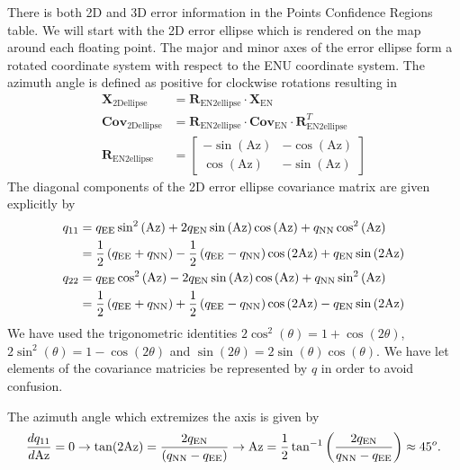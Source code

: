 There is both 2D and 3D error information in the Points Confidence Regions table.  We will start with the 2D error ellipse which is rendered on the map around each floating point.  The major and minor axes of the error ellipse form a rotated coordinate system with respect to the ENU coordinate system. The azimuth angle is defined as positive for clockwise rotations resulting in
\begin{equation}
\begin{split}
\mathbf{X}_{\text{2Dellipse}}&=\mathbf{R}_{\text{EN2ellipse}}\cdot\mathbf{X}_{\text{EN}} \\
\mathbf{Cov}_{\text{2Dellipse}}&=\mathbf{R}_{\text{EN2ellipse}}\cdot\mathbf{Cov}_{\text{EN}}\cdot\mathbf{R}_{\text{EN2ellipse}}^T\\
\mathbf{R}_{\text{EN2ellipse}}&=\left[\begin{array}{cc}-\sin\left(\text{Az}\right)&-\cos\left(\text{Az}\right)\\\cos\left(\text{Az}\right)&-\sin\left(\text{Az}\right)\end{array}\right]
\end{split}
\end{equation}
The diagonal components of the 2D error ellipse covariance matrix are given explicitly by
\begin{equation}
\begin{split}
q_{11}&=q_{\text{EE}}\sin^2\left(\text{Az}\right)+2q_{\text{EN}}\sin\left(\text{Az}\right)\cos\left(\text{Az}\right)+q_{\text{NN}}\cos^2\left(\text{Az}\right)\\
&=\frac{1}{2}\left(q_{\text{EE}}+q_{\text{NN}}\right)-\frac{1}{2}\left(q_{\text{EE}}-q_{\text{NN}}\right)\cos\left(2\text{Az}\right)+q_{\text{EN}}\sin\left(2\text{Az}\right)\\
q_{22}&=q_{\text{EE}}\cos^2\left(\text{Az}\right)-2q_{\text{EN}}\sin\left(\text{Az}\right)\cos\left(\text{Az}\right)+q_{\text{NN}}\sin^2\left(\text{Az}\right)\\
&=\frac{1}{2}\left(q_{\text{EE}}+q_{\text{NN}}\right)+\frac{1}{2}\left(q_{\text{EE}}-q_{\text{NN}}\right)\cos\left(2\text{Az}\right)-q_{\text{EN}}\sin\left(2\text{Az}\right)
\end{split}
\end{equation}
We have used the trigonometric identities $2\cos^2(\theta)=1+\cos(2\theta)$, $2\sin^2(\theta)=1-\cos(2\theta)$ and $\sin(2\theta)=2\sin(\theta) \cos(\theta)$.  We have let elements of the covariance matricies be represented by $q$ in order to avoid confusion.

The azimuth angle which extremizes the axis is given by
\begin{equation}
\frac{dq_{11}}{d\text{Az}}=0\rightarrow\tan(2\text{Az})=\frac{2q_{\text{EN}}}{(q_{\text{NN}}-q_{\text{EE}})}\rightarrow\text{Az}=\frac{1}{2}\tan^{-1}\left(\frac{2q_{\text{EN}}}{q_{\text{NN}}-q_{\text{EE}}}\right)\approx45^o.
\end{equation}

